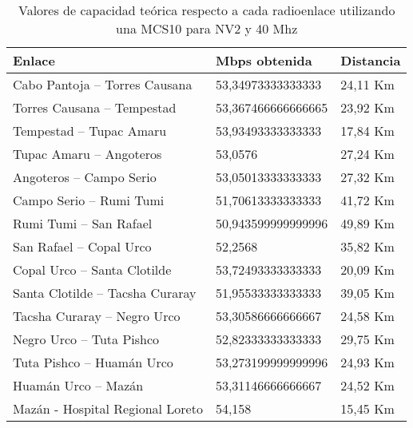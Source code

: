 \begin{table}[H]
	\begin{center}
		\begin{tabular}{|l|l|l|}
			\hline
			Enlace & Mbps obtenida & Distancia \\
			\hline 
			Cabo Pantoja – Torres Causana & 53,34973333333333 & 24,11 Km \\ \hline	
			Torres Causana – Tempestad & 53,367466666666665 & 23,92 Km \\ \hline
			Tempestad – Tupac Amaru & 53,93493333333333 & 17,84 Km \\ \hline
			Tupac Amaru – Angoteros & 53,0576 & 27,24 Km \\ \hline
			Angoteros – Campo Serio & 53,05013333333333 & 27,32 Km \\ \hline
			Campo Serio – Rumi Tumi & 51,70613333333333 & 41,72 Km \\ \hline
			Rumi Tumi – San Rafael & 50,943599999999996 & 49,89 Km \\ \hline
			San Rafael – Copal Urco & 52,2568 & 35,82 Km \\ \hline
			Copal Urco – Santa Clotilde & 53,72493333333333 & 20,09 Km \\ \hline
			Santa Clotilde – Tacsha Curaray & 51,95533333333333 & 39,05 Km \\ \hline
			Tacsha Curaray – Negro Urco & 53,30586666666667 & 24,58 Km \\ \hline
			Negro Urco – Tuta Pishco & 52,82333333333333 & 29,75 Km \\ \hline
			Tuta Pishco – Huamán Urco & 53,273199999999996 & 24,93 Km \\ \hline
			Huamán Urco – Mazán & 53,31146666666667 & 24,52 Km \\ \hline
			Mazán - Hospital Regional Loreto & 54,158 & 15,45 Km \\ \hline
		\end{tabular}
	\end{center}
	\caption{Valores de capacidad teórica respecto a cada radioenlace utilizando una MCS10 para NV2 y 40 Mhz}
	\label{table:capacidades}
\end{table}

